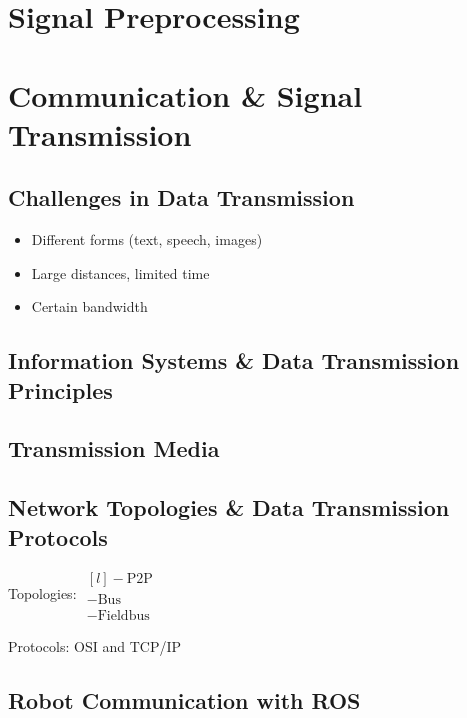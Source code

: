 \section{Signal Preprocessing}

\section{Communication \& Signal Transmission}
\subsection{Challenges in Data Transmission}
\begin{itemize}
	\item Different forms (text, speech, images)
	\item Large distances, limited time
	\item Certain bandwidth
\end{itemize}

\subsection{Information Systems \& Data Transmission Principles}
\subsection{Transmission Media}
\subsection{Network Topologies \& Data Transmission Protocols}
Topologies: $\begin{matrix*}[l]
	- \text{P2P}\\
	- \text{Bus}\\
	- \text{Fieldbus}
\end{matrix*}$

Protocols: OSI and TCP/IP

\subsection{Robot Communication with ROS}